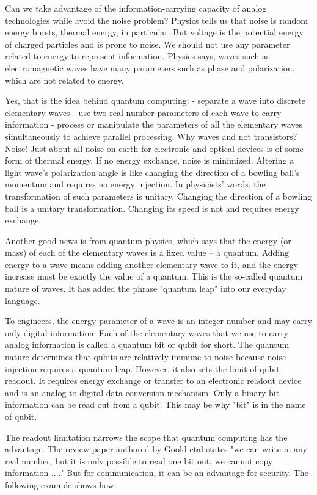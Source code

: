 \documentclass[oneside, letter, 12pt]{book}
\begin{document}
Can we take advantage of the information-carrying capacity of analog technologies while avoid the noise problem? Physics tells us that noise is random energy bursts, thermal energy, in particular. But voltage is the potential energy of charged particles and is prone to noise. We should not use any parameter related to energy to represent information. Physics says, waves such as electromagnetic waves have many parameters such as phase and polarization, which are not related to energy.

Yes, that is the idea behind quantum computing:
- separate a wave into discrete elementary waves
- use two real-number parameters of each wave to carry information
- process or manipulate the parameters of all the elementary waves simultaneously to achieve parallel processing.
Why waves and not transistors? Noise! Just about all noise on earth for electronic and optical devices is of some form of thermal energy. If no energy exchange, noise is minimized. Altering a light wave's polarization angle is like changing the direction of a bowling ball's momentum and requires no energy injection. In physicists' words, the transformation of such parameters is unitary. Changing the direction of a bowling ball is a unitary transformation. Changing its speed is not and requires energy exchange.

Another good news is from quantum physics, which says that the energy (or mass) of each of the elementary waves is a fixed value -- a quantum. Adding energy to a wave means adding another elementary wave to it, and the energy increase must be exactly the value of a quantum. This is the so-called quantum nature of waves. It has added the phrase "quantum leap" into our everyday language.

To engineers, the energy parameter of a wave is an integer number and may carry only digital information. Each of the elementary waves that we use to carry analog information is called a quantum bit or qubit for short. The quantum nature determines that qubits are relatively immune to noise because noise injection requires a quantum leap. However, it also sets the limit of qubit readout. It requires energy exchange or transfer to an electronic readout device and is an analog-to-digital data conversion mechanism. Only a binary bit information can be read out from a qubit. This may be why "bit" is in the name of qubit.

The readout limitation narrows the scope that quantum computing has the advantage. The review paper\cite{thermoGoold} authored by Goold etal states "we can write in any real number, but it is only possible
to read one bit out, we cannot copy information ...." But for communication, it can be an advantage for security. The following example shows how.
\end{document}
